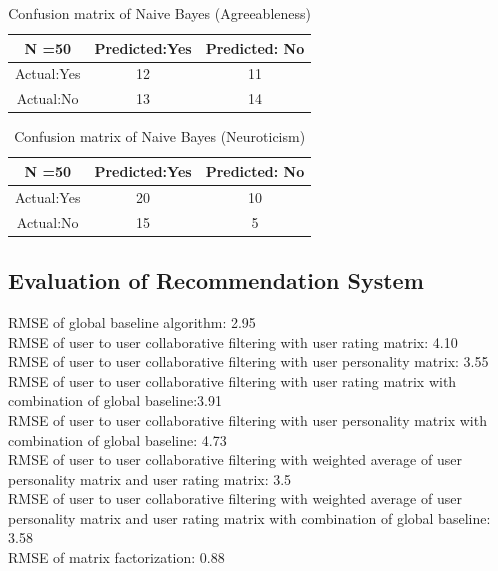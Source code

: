 \begin{table}[!ht]
\centering
\begin{tabular}{ |c|c|c| } 
 \hline
 N =50 & Predicted:Yes & Predicted: No \\
 \hline
 Actual:Yes&12 & 11 \\ 
 \hline
 Actual:No&13 & 14 \\ 
 \hline
\end{tabular}
 \caption{Confusion matrix of Naive Bayes (Agreeableness)}
\end{table}

\begin{table}[!ht]
\centering
\begin{tabular}{ |c|c|c| } 
 \hline
 N =50 & Predicted:Yes & Predicted: No \\
 \hline
 Actual:Yes&20 & 10 \\ 
 \hline
 Actual:No&15 & 5 \\ 
 \hline
\end{tabular}
 \caption{Confusion matrix of Naive Bayes (Neuroticism)}
\end{table}


\subsection{Evaluation of Recommendation System}
RMSE of global baseline algorithm: 2.95\\
RMSE of user to user collaborative filtering with user rating matrix: 4.10\\
RMSE of user to user collaborative filtering with user personality matrix: 3.55\\
RMSE of user to user collaborative filtering with user rating matrix with combination of global baseline:3.91 \\
RMSE of user to user collaborative filtering with user personality matrix with combination of global baseline: 4.73\\
RMSE of user to user collaborative filtering with weighted average of user personality matrix and user rating matrix: 3.5\\
RMSE of user to user collaborative filtering with weighted average of user personality matrix and user rating matrix with combination of global baseline: 3.58\\
RMSE of matrix factorization: 0.88\\



